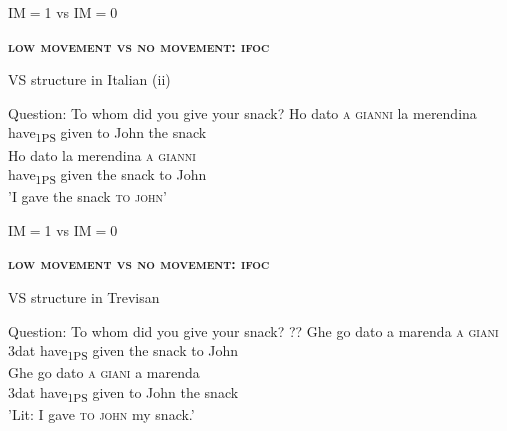 \documentclass[lesson_slides]{subfiles}
\begin{document}
\begin{frame}[c]{IM$=$1 vs IM$=$0}

    \noindent \textbf{\textsc{low movement vs no movement: ifoc}}

    \begin{exe}
     VS structure in Italian (ii) \pause
        \begin{xlist}
            \ex Question: To whom did you give your snack?
            \ex \gll * Ho dato \textsc{a} \textsc{gianni} la merendina\\
            {} have\textsubscript{1PS} given to John the snack\\  
            \ex \gll Ho dato la merendina \textsc{a} \textsc{gianni}\\ \pause
            have\textsubscript{1PS} given the snack to John\\
            \glt 'I gave the snack \textsc{to} \textsc{john}'
        \end{xlist}
    \end{exe}

\end{frame}
\begin{frame}[c]{IM$=$1 vs IM$=$0}

    \noindent \textbf{\textsc{low movement vs no movement: ifoc}}

    \begin{exe}
        \ex VS structure in Trevisan \pause
            \begin{xlist}
                \ex Question: To whom did you give your snack? \pause
                \ex \gll ?? Ghe go dato a marenda \textsc{a} \textsc{giani}\\
                {} 3dat have\textsubscript{1PS} given the snack to John\\
                \ex \gll Ghe go dato \textsc{a} \textsc{giani} a marenda\\
                3dat have\textsubscript{1PS} given to John the snack\\
                \glt 'Lit: I gave \textsc{to} \textsc{john} my snack.'
            \end{xlist}
    \end{exe}

\end{frame}
\end{document}
